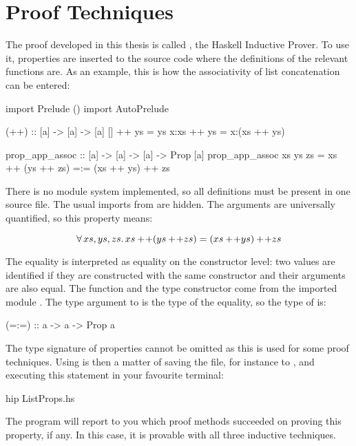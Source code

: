 \chapter{Proof Techniques}
\label{ch:proofs}

The proof developed in this thesis is called , the Haskell
Inductive Prover. To use it, properties are inserted to the source
code where the definitions of the relevant functions are. As an
example, this is how the associativity of list concatenation can be
entered:

\begin{code}
import Prelude ()
import AutoPrelude

(++) :: [a] -> [a] -> [a]
[]   ++ ys = ys
x:xs ++ ys = x:(xs ++ ys)

prop_app_assoc :: [a] -> [a] -> [a] -> Prop [a]
prop_app_assoc xs ys zs = xs ++ (ys ++ zs) =:= (xs ++ ys) ++ zs
\end{code}

\noindent
There is no module system implemented, so all definitions must be
present in one source file. The usual imports from  are
hidden. The arguments are universally quantified, so this property
means:

\newcommand\append{+\!+}
\begin{equation*}
  \faaa{xs}{ys}{zs} xs \append (ys \append zs) = (xs \append ys) \append zs
\end{equation*}

\noindent
The equality is interpreted as equality on the constructor level: two
values are identified if they are constructed with the same
constructor and their arguments are also equal.  The function \hs{=:=}
and the type constructor  come from the imported module
.  The type argument to  is the type of the
equality, so the type of \hs{=:=} is:

\begin{code}
(=:=) :: a -> a -> Prop a
\end{code}

The type signature of properties cannot be omitted as this is used for
some proof techniques. Using  is then a matter of saving the
file, for instance to , and executing this statement
in your favourite terminal:

\begin{code}
hip ListProps.hs
\end{code}

The program will report to you which proof methods succeeded on proving
this property, if any. In this case, it is provable with all three
inductive techniques.

